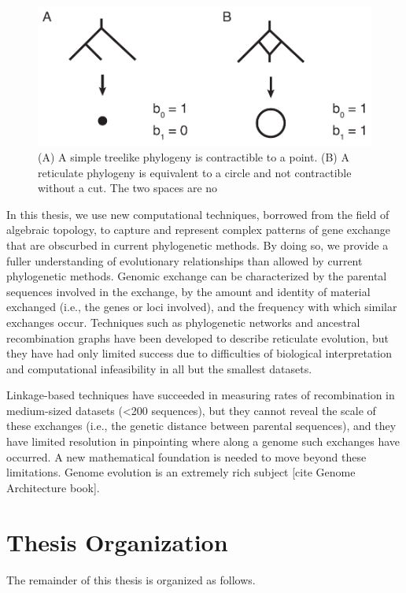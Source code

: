 \begin{figure}
\centering
\includegraphics[width=.8\columnwidth]{./fig/introduction/simple_tree_example.pdf}
\caption[Treelike and reticulate phylogenies]{(A) A simple treelike phylogeny is contractible to a point. (B) A reticulate phylogeny is equivalent to a circle and not contractible without a cut. The two spaces are no}
\label{intro:fig:simple_tree_example}
\end{figure}

In this thesis, we use new computational techniques, borrowed from the field of algebraic topology, to capture and represent complex patterns of gene exchange that are obscurbed in current phylogenetic methods.
By doing so, we provide a fuller understanding of evolutionary relationships than allowed by current phylogenetic methods.
Genomic exchange can be characterized by the parental sequences involved in the exchange, by the amount and identity of material exchanged (i.e., the genes or loci involved), and the frequency with which similar exchanges occur.
Techniques such as phylogenetic networks and ancestral recombination graphs have been developed to describe reticulate evolution, but they have had only limited success due to difficulties of biological interpretation and computational infeasibility in all but the smallest datasets.

Linkage-based techniques have succeeded in measuring rates of recombination in medium-sized datasets (<200 sequences), but they cannot reveal the scale of these exchanges (i.e., the genetic distance between parental sequences), and they have limited resolution in pinpointing where along a genome such exchanges have occurred.
A new mathematical foundation is needed to move beyond these limitations.
Genome evolution is an extremely rich subject [cite Genome Architecture book].

\section{Thesis Organization}

The remainder of this thesis is organized as follows.

